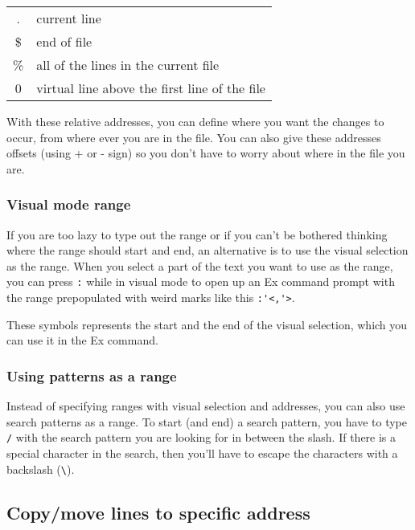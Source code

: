 \begin{tabular}{c|l}
    .  & current line\\
    \$ & end of file\\
    \% & all of the lines in the current file\\
    0  & virtual line above the first line of the file\\
\end{tabular}
\newline

With these relative addresses, you can define where you want the changes to occur, from where ever you are in the file.
You can also give these addresses offsets (using + or - sign) so you don't have to worry about where in the file you are.

\subsubsection{Visual mode range}

If you are too lazy to type out the range or if you can't be bothered thinking where the range should start and end, an alternative is to use the visual selection as the range.
When you select a part of the text you want to use as the range, you can press \verb|:| while in visual mode to open up an Ex command prompt with the range prepopulated with weird marks like this \verb|:'<,'>|.

These symbols represents the start and the end of the visual selection, which you can use it in the Ex command.

\subsubsection{Using patterns as a range}

Instead of specifying ranges with visual selection and addresses, you can also use search patterns as a range.
To start (and end) a search pattern, you have to type \verb|/| with the search pattern you are looking for in between the slash.
If there is a special character in the search, then you'll have to escape the characters with a backslash (\verb|\|).

\subsection{Copy/move lines to specific address}

